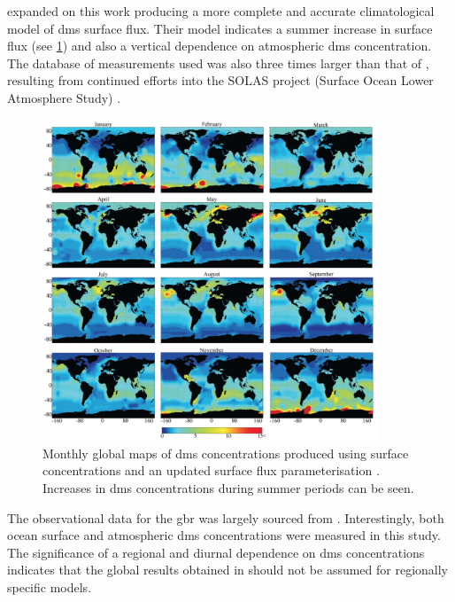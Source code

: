 	\citet{lana2011updated} expanded on this work producing a more complete and accurate climatological model of \gls{dms} surface flux. Their model indicates a summer increase in surface flux (see \cref{fig:lanadmsmaps}) and also a vertical dependence on atmospheric \gls{dms} concentration. The database of measurements used was also three times larger than that of \citet{kettle1999global}, resulting from continued efforts into the SOLAS project (Surface Ocean Lower Atmosphere Study) \citep{lana2011updated}.

	\begin{figure}[!htb]
	    \centering
	    \includegraphics[width=0.9\textwidth,natwidth=1414,natheight=1344]{Fig/lanadmsmaps.png}
	    \caption{Monthly global maps of \gls{dms} concentrations produced using surface concentrations and an updated surface flux parameterisation \citep{lana2011updated}. Increases in \gls{dms} concentrations during summer periods can be seen.}
	    \label{fig:lanadmsmaps}
	\end{figure}

	The observational data for the \gls{gbr} was largely sourced from \citet{jones:2005ez}. Interestingly, both ocean surface and atmospheric \gls{dms} concentrations were measured in this study. The significance of a regional and diurnal dependence on \gls{dms} concentrations indicates that the global results obtained in \citet{lana2011updated} should not be assumed for regionally specific models.



